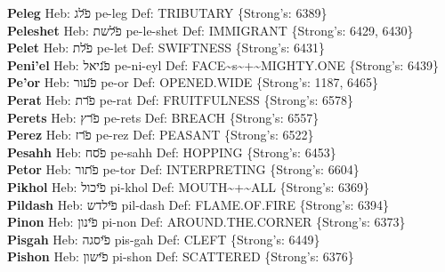 {\textbf{Peleg} Heb: {\large\H פלג} pe-leg Def: TRIBUTARY \{Strong's: 6389\}\hfill{}\\

\textbf{Peleshet} Heb: {\large\H פלשת} pe-le-shet Def: IMMIGRANT \{Strong's: 6429, 6430\}\hfill{}\\

\textbf{Pelet} Heb: {\large\H פלת} pe-let Def: SWIFTNESS \{Strong's: 6431\}\hfill{}\\

\textbf{Peni'el} Heb: {\large\H פניאל} pe-ni-eyl Def: FACE\textasciitilde{}s\textasciitilde{}+\textasciitilde{}MIGHTY.ONE \{Strong's: 6439\}\hfill{}\\

\textbf{Pe'or} Heb: {\large\H פעור} pe-or Def: OPENED.WIDE \{Strong's: 1187, 6465\}\hfill{}\\

\textbf{Perat} Heb: {\large\H פרת} pe-rat Def: FRUITFULNESS \{Strong's: 6578\}\hfill{}\\

\textbf{Perets} Heb: {\large\H פרץ} pe-rets Def: BREACH \{Strong's: 6557\}\hfill{}\\

\textbf{Perez} Heb: {\large\H פרז} pe-rez Def: PEASANT \{Strong's: 6522\}\hfill{}\\

\textbf{Pesahh} Heb: {\large\H פסח} pe-sahh Def: HOPPING \{Strong's: 6453\}\hfill{}\\

\textbf{Petor} Heb: {\large\H פתור} pe-tor Def: INTERPRETING \{Strong's: 6604\}\hfill{}\\

\textbf{Pikhol} Heb: {\large\H פיכול} pi-khol Def: MOUTH\textasciitilde{}+\textasciitilde{}ALL \{Strong's: 6369\}\hfill{}\\

\textbf{Pildash} Heb: {\large\H פילדש} pil-dash Def: FLAME.OF.FIRE \{Strong's: 6394\}\hfill{}\\

\textbf{Pinon} Heb: {\large\H פינון} pi-non Def: AROUND.THE.CORNER \{Strong's: 6373\}\hfill{}\\

\textbf{Pisgah} Heb: {\large\H פיסגה} pis-gah Def: CLEFT \{Strong's: 6449\}\hfill{}\\

\textbf{Pishon} Heb: {\large\H פישון} pi-shon Def: SCATTERED \{Strong's: 6376\}\hfill{}\\

}
